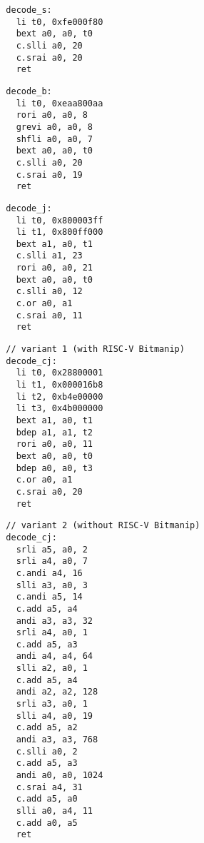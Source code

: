 \begin{multicols}{2}
\begin{minipage}{\linewidth}
\begin{verbatim}
  decode_s:
    li t0, 0xfe000f80
    bext a0, a0, t0
    c.slli a0, 20
    c.srai a0, 20
    ret
\end{verbatim}
\end{minipage}

\begin{minipage}{\linewidth}
\begin{verbatim}
  decode_b:
    li t0, 0xeaa800aa
    rori a0, a0, 8
    grevi a0, a0, 8
    shfli a0, a0, 7
    bext a0, a0, t0
    c.slli a0, 20
    c.srai a0, 19
    ret
\end{verbatim}
\end{minipage}

\begin{minipage}{\linewidth}
\begin{verbatim}
  decode_j:
    li t0, 0x800003ff
    li t1, 0x800ff000
    bext a1, a0, t1
    c.slli a1, 23
    rori a0, a0, 21
    bext a0, a0, t0
    c.slli a0, 12
    c.or a0, a1
    c.srai a0, 11
    ret
\end{verbatim}
\end{minipage}

\begin{minipage}{\linewidth}
\begin{verbatim}
  // variant 1 (with RISC-V Bitmanip)
  decode_cj:
    li t0, 0x28800001
    li t1, 0x000016b8
    li t2, 0xb4e00000
    li t3, 0x4b000000
    bext a1, a0, t1
    bdep a1, a1, t2
    rori a0, a0, 11
    bext a0, a0, t0
    bdep a0, a0, t3
    c.or a0, a1
    c.srai a0, 20
    ret
\end{verbatim}
\end{minipage}

\begin{minipage}{\linewidth}
\begin{verbatim}
  // variant 2 (without RISC-V Bitmanip)
  decode_cj:
    srli a5, a0, 2
    srli a4, a0, 7
    c.andi a4, 16
    slli a3, a0, 3
    c.andi a5, 14
    c.add a5, a4
    andi a3, a3, 32
    srli a4, a0, 1
    c.add a5, a3
    andi a4, a4, 64
    slli a2, a0, 1
    c.add a5, a4
    andi a2, a2, 128
    srli a3, a0, 1
    slli a4, a0, 19
    c.add a5, a2
    andi a3, a3, 768
    c.slli a0, 2
    c.add a5, a3
    andi a0, a0, 1024
    c.srai a4, 31
    c.add a5, a0
    slli a0, a4, 11
    c.add a0, a5
    ret
\end{verbatim}
\end{minipage}


\end{multicols}
